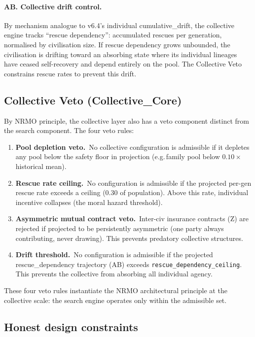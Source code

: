 \paragraph{AB. Collective drift control.}
By mechanism analogue to v6.4's individual cumulative\_drift, the
collective engine tracks ``rescue dependency'': accumulated rescues
per generation, normalised by civilisation size. If rescue
dependency grows unbounded, the civilisation is drifting toward an
absorbing state where its individual lineages have ceased
self-recovery and depend entirely on the pool. The Collective Veto
constrains rescue rates to prevent this drift.

\subsection{Collective Veto (Collective\_Core)}

By NRMO principle, the collective layer also has a veto component
distinct from the search component. The four veto rules:

\begin{enumerate}
\item \textbf{Pool depletion veto.}\ No collective configuration is
admissible if it depletes any pool below the safety floor in
projection (e.g.\,family pool below $0.10 \times$ historical mean).
\item \textbf{Rescue rate ceiling.}\ No configuration is admissible
if the projected per-gen rescue rate exceeds a ceiling
($0.30$ of population). Above this rate, individual incentive
collapses (the moral hazard threshold).
\item \textbf{Asymmetric mutual contract veto.}\ Inter-civ insurance
contracts (Z) are rejected if projected to be persistently
asymmetric (one party always contributing, never drawing). This
prevents predatory collective structures.
\item \textbf{Drift threshold.}\ No configuration is admissible if
the projected rescue\_dependency trajectory (AB) exceeds
\texttt{rescue\_dependency\_ceiling}. This prevents the
collective from absorbing all individual agency.
\end{enumerate}

These four veto rules instantiate the NRMO architectural principle
at the collective scale: the search engine operates only within the
admissible set.

\subsection{Honest design constraints}

